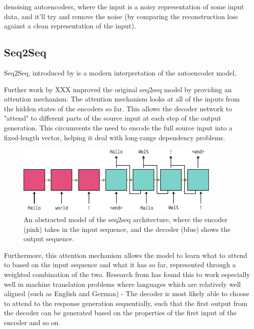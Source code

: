\documentclass[12pt,twoside]{report}
\begin{document}

denoising autoencoders, where the input is a noisy representation of some input data, and it'll try and remove the noise (by comparing the reconstruction loss against a clean representation of the input).

\subsection{Seq2Seq}

Seq2Seq, introduced by \cite{sutskever_sequence_2014} is a modern interpretation of the autoencoder model,


Further work by XXX improved the original seq2seq model by providing an attention mechanism. The attention mechanism looks at all of the inputs from the hidden states of the encoders so far. This allows the decoder network to "attend" to different parts of the source input at each step of the output generation. This circumvents the need to encode the full source input into a fixed-length vector, helping it deal with long-range dependency problems.


\begin{figure}[!ht]
      
	\centering
	\includegraphics[width=100mm]{diagrams/seq2seq.pdf}
	\caption{An abstracted model of the seq2seq architecture, where the encoder (pink) takes in the input sequence, and the decoder (blue) shows the output sequence.\label{seq2seq}}
  \end{figure}


Furthermore, this attention mechanism allows the model to learn what to attend to based on the input sequence and what it has so far, represented through a weighted combination of the two. Research from \cite{bahdanau_neural_2014} has found this to work especially well in machine translation problems where languages which are relatively well aligned (such as English and German) - The decoder is most likely able to choose to attend to the response generation sequentially, such that the first output from the decoder can be generated based on the properties of the first input of the encoder and so on.
\end{document}
